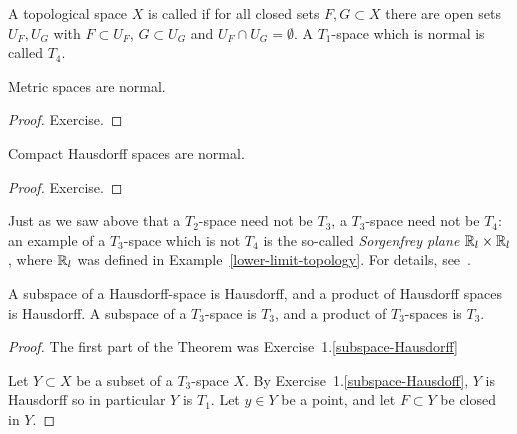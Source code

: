 \begin{defn}
  A topological space $X$ is called  if for all closed sets $F,G \subset X$ there are open sets $U_F, U_G$ with $F \subset U_F$, $G \subset U_G$ and $U_F \cap U_G = \emptyset$. A $T_1$-space which is normal is called $T_4$.
\end{defn}
\begin{prop}
  Metric spaces are normal.
\end{prop}
\begin{proof}
  Exercise.
\end{proof}
\begin{prop}
  Compact Hausdorff spaces are normal.
\end{prop}
\begin{proof}
  Exercise.
\end{proof}
\begin{example}
  Just as we saw above that a $T_2$-space need not be $T_3$, a $T_3$-space need not be $T_4$: an example of a $T_3$-space which is not $T_4$ is the so-called \emph{Sorgenfrey plane} $\mathbb{R}_l \times \mathbb{R}_l$, where $\mathbb{R}_l$ was defined in Example~\ref{lower-limit-topology}. For details, see~\cite[\S 31, Example 3]{Mun}.
\end{example}

\begin{thm}
  A subspace of a Hausdorff-space is Hausdorff, and a product of Hausdorff spaces is Hausdorff. A subspace of a $T_3$-space is $T_3$, and a product of $T_3$-spaces is $T_3$.
\end{thm}
\begin{proof}
  The first part of the Theorem was Exercise~1.\ref{subspace-Hausdorff}

  Let $Y \subset X$ be a subset of a $T_3$-space $X$. By Exercise~1.\ref{subspace-Hausdoff}, $Y$ is Hausdorff so in particular $Y$ is $T_1$. Let $y \in Y$ be a point, and let $F \subset Y$ be closed in $Y$.
\end{proof}

